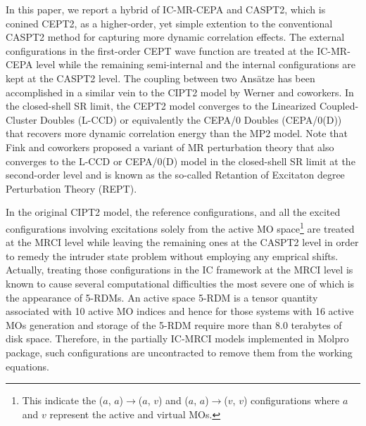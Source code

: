 \documentclass[aip,jcp,amsmath]{revtex4-1}
\begin{document}
%
In this paper, we report a hybrid of IC-MR-CEPA and CASPT2, which is conined CEPT2, as a higher-order, yet simple extention to the conventional CASPT2 method for capturing more dynamic correlation effects.
%
The external configurations in the first-order CEPT wave function are treated at the IC-MR-CEPA level while the remaining semi-internal and the internal configurations are kept at the CASPT2 level.
%
The coupling between two Ans\"atze has been accomplished in a similar vein to the CIPT2 model by Werner and coworkers.\cite{celanithe2004}
%
In the closed-shell SR limit, the CEPT2 model converges to the Linearized Coupled-Cluster Doubles (L-CCD) or equivalently the CEPA/0 Doubles (CEPA/0(D)) that recovers more dynamic correlation energy than the MP2 model.
%
Note that Fink and coworkers proposed a variant of MR perturbation theory\cite{FINK2006461,FINK200939,doi:10.1021/acs.jctc.6b00898} that also converges to the L-CCD or CEPA/0(D) model in the closed-shell SR limit at the second-order level and is known as the so-called Retantion of Excitaton degree Perturbation Theory (REPT).

%
In the original CIPT2 model,\cite{Celani2000,PCMRCI2011} the reference configurations, and all the excited configurations involving excitations solely from the active MO space\footnote{This indicate the ($a$, $a$)$\rightarrow$($a$, $v$) and ($a$, $a$)$\rightarrow$($v$, $v$) configurations where $a$ and $v$ represent the active and virtual MOs.} are treated at the MRCI level while leaving the remaining ones at the CASPT2 level in order to remedy the intruder state problem without employing any emprical shifts.
%
Actually, treating those configurations in the IC framework at the MRCI level is known to cause several computational difficulties the most severe one of which is the appearance of 5-RDMs.\cite{doi:10.1063/1.443357}
%
An active space 5-RDM is a tensor quantity associated with 10 active MO indices and hence for those systems with 16 active MOs generation and storage of the 5-RDM require more than 8.0 terabytes of disk space.
%
Therefore, in the partially IC-MRCI models\cite{PCMRCI1988,PCMRCI2011} implemented in Molpro package,\cite{Molpro} such configurations are uncontracted to remove them from the working equations.
\end{document}
